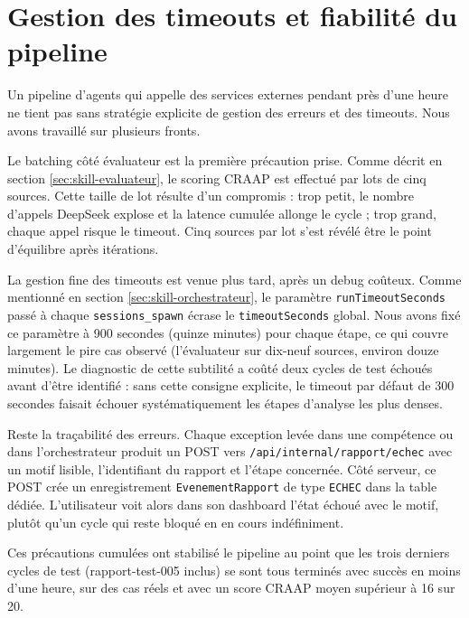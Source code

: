 \documentclass[12pt,a4paper,openany]{report}
\begin{document}
\section{Gestion des timeouts et fiabilité du pipeline}
\label{sec:timeouts-fiabilite}

Un pipeline d'agents qui appelle des services externes pendant près d'une heure ne tient pas sans stratégie explicite de gestion des erreurs et des timeouts. Nous avons travaillé sur plusieurs fronts.

Le batching côté évaluateur est la première précaution prise. Comme décrit en section \ref{sec:skill-evaluateur}, le scoring CRAAP est effectué par lots de cinq sources. Cette taille de lot résulte d'un compromis : trop petit, le nombre d'appels DeepSeek explose et la latence cumulée allonge le cycle ; trop grand, chaque appel risque le timeout. Cinq sources par lot s'est révélé être le point d'équilibre après itérations.

La gestion fine des timeouts est venue plus tard, après un debug coûteux. Comme mentionné en section \ref{sec:skill-orchestrateur}, le paramètre \texttt{runTimeoutSeconds} passé à chaque \texttt{sessions\_spawn} écrase le \texttt{timeoutSeconds} global. Nous avons fixé ce paramètre à 900 secondes (quinze minutes) pour chaque étape, ce qui couvre largement le pire cas observé (l'évaluateur sur dix-neuf sources, environ douze minutes). Le diagnostic de cette subtilité a coûté deux cycles de test échoués avant d'être identifié : sans cette consigne explicite, le timeout par défaut de 300 secondes faisait échouer systématiquement les étapes d'analyse les plus denses.

Reste la traçabilité des erreurs. Chaque exception levée dans une compétence ou dans l'orchestrateur produit un POST vers \texttt{/api/internal/rapport/echec} avec un motif lisible, l'identifiant du rapport et l'étape concernée. Côté serveur, ce POST crée un enregistrement \texttt{EvenementRapport} de type \texttt{ECHEC} dans la table dédiée. L'utilisateur voit alors dans son dashboard l'état \og échoué \fg{} avec le motif, plutôt qu'un cycle qui reste bloqué en \og en cours \fg{} indéfiniment.

Ces précautions cumulées ont stabilisé le pipeline au point que les trois derniers cycles de test (rapport-test-005 inclus) se sont tous terminés avec succès en moins d'une heure, sur des cas réels et avec un score CRAAP moyen supérieur à 16 sur 20.

\end{document}
